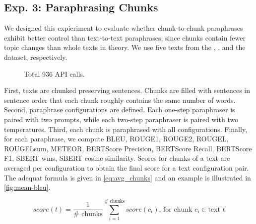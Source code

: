 \subsection{Exp. 3: Paraphrasing Chunks}
\label{subsec:paraphrasing_chunks}

We designed this expieriment to evaluate whether chunk-to-chunk paraphrases exhibit better control than text-to-text paraphrases, since chunks contain fewer topic changes than whole texts in theory.
We use five texts from the \dataBlog{}, \dataGutenberg{}, and the \dataStudent{} dataset, respectively.


\begin{figure}[htbp]
\centering
    
  \caption{Total 936 API calls. 
  }
  \label{fig:chunks_api_calls}
\end{figure}


First, texts are chunked preserving sentences.
Chunks are filled with sentences in sentence order that each chunk roughly contains the same number of words.
Second, paraphrase configurations are defined.
Each one-step paraphraser is paired with two prompts, while each two-step paraphraser is paired with two temperatures.
Third, each chunk is paraphrased with all configurations.
Finally, for each paraphrase, we compute BLEU, ROUGE1, ROUGE2, ROUGEL, ROUGELsum, METEOR, BERTScore Precision, BERTScore Recall, BERTScore F1, SBERT \ac{wms}, SBERT cosine similarity.
Scores for chunks of a text are averaged per configuration to obtain the final score for a text configuration pair.
The adequat formula is given in \autoref{eq:avg_chunks} and an example is illustrated in \autoref{fig:mean-bleu}.

\begin{equation}
    score(t) = \frac{1}{\#\text{ chunks}}\sum_{i=1}^{\#\text{ chunks}}score(c_i)\text{, for chunk }c_i \in \text{text }t
\label{eq:avg_chunks}
\end{equation}

